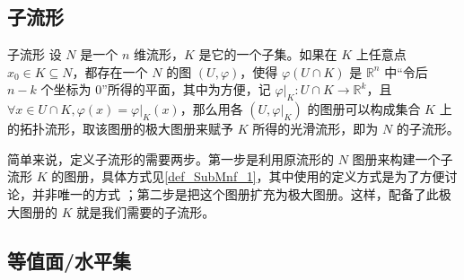 

\begin{issues}
\issueDraft
\end{issues}


\subsection{子流形}

\begin{definition}{子流形}\label{def_SubMnf_1}
设 $N$ 是一个 $n$ 维流形，$K$ 是它的一个子集。如果在 $K$ 上任意点 $x_0\in K\subseteq N$，都存在一个 $N$ 的图 $(U, \varphi)$，使得 $\varphi (U\cap K)$ 是 $\mathbb{R}^n$ 中“令后 $n-k$ 个坐标为 $0$”所得的平面，其中为方便，记 $\varphi|_K:U\cap K\rightarrow\mathbb{R}^k$，且 $\forall x\in U\cap K, \varphi(x)=\varphi|_K(x)$，那么用各 $(U, \varphi|_K)$ 的图册可以构成集合 $K$ 上的拓扑流形，取该图册的极大图册来赋予 $K$ 所得的光滑流形，即为 $N$ 的子流形。
\end{definition}

简单来说，定义子流形的需要两步。第一步是利用原流形的 $N$ 图册来构建一个子流形 $K$ 的图册，具体方式见\autoref{def_SubMnf_1}，其中使用的定义方式是为了方便讨论，并非唯一的方式 ；第二步是把这个图册扩充为极大图册。这样，配备了此极大图册的 $K$ 就是我们需要的子流形。


\subsection{等值面/水平集}%
